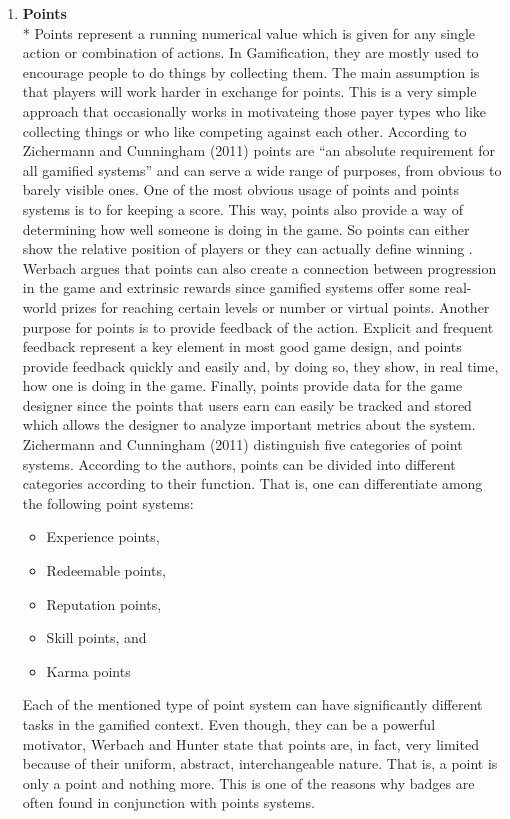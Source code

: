 \begin{enumerate}
\item \textbf{Points}\\*
Points represent a running numerical value which is given for any single action or combination of actions. In Gamification, they are mostly used to encourage people to do things by collecting them. The main assumption is that players will work harder in exchange for points. This is a very simple approach that occasionally works in motivateing those payer types who like collecting things or who like competing against each other. According to Zichermann and Cunningham (2011) points are ``an absolute requirement for all gamified systems'' and can serve a wide range of purposes, from obvious to barely visible ones. One of the most obvious usage of points and points systems is to for keeping a score. This way, points also provide a way of determining how well someone is doing in the game. So points can either show the relative position of players or they can actually define winning \cite{WerbachCoursera}. Werbach argues that points can also create a connection between progression in the game and extrinsic rewards since gamified systems offer some real-world prizes for reaching certain levels or number or virtual points. Another purpose for points is to provide feedback of the action. Explicit and frequent feedback represent a key element in most good game design, and points provide feedback quickly and easily and, by doing so, they show, in real time, how one is doing in the game. Finally, points provide data for the game designer since the points that users earn can easily be tracked and stored which allows the designer to analyze important metrics about the system. Zichermann and Cunningham (2011) distinguish five categories of point systems. According to the authors, points  can  be  divided  into  different categories  according  to  their  function. That is, one can differentiate among the following point systems: 
\begin{itemize}
\item Experience points,
\item Redeemable points,
\item Reputation points, 
\item Skill points, and
\item Karma  points
\end{itemize}
Each of the mentioned type of point system can have significantly different tasks in the gamified context. Even though, they can be a powerful motivator, Werbach and Hunter state that points are, in fact, very limited because of their uniform, abstract, interchangeable nature. That is, a point is only a point and nothing more. This is one of the reasons why badges are often found in conjunction with points systems.

\end{enumerate}
